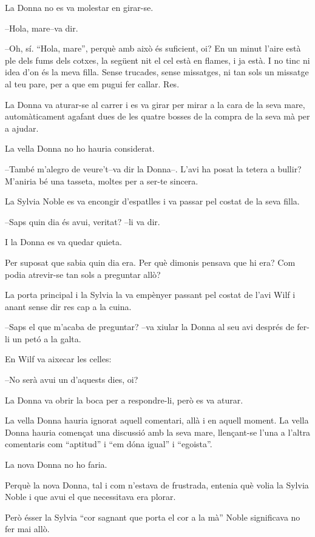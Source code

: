 La Donna no es va molestar en girar-se.

--Hola, mare--va dir.

--Oh, sí. ``Hola, mare'', perquè amb això és suficient, oi? En un minut
l'aire està ple dels fums dels cotxes, la següent nit el cel està en
flames, i ja està. I no tinc ni idea d'on és la meva filla. Sense
trucades, sense missatges, ni tan sols un missatge al teu pare, per a
que em pugui fer callar. Res.

La Donna va aturar-se al carrer i es va girar per mirar a la cara de la
seva mare, automàticament agafant dues de les quatre bosses de la compra
de la seva mà per a ajudar.

La vella Donna no ho hauria considerat.

--També m'alegro de veure't--va dir la Donna--. L'avi ha posat la tetera
a bullir? M'aniria bé una tasseta, moltes per a ser-te sincera.

La Sylvia Noble es va encongir d'espatlles i va passar pel costat de la
seva filla.

--Saps quin dia és avui, veritat? --li va dir.

I la Donna es va quedar quieta.

Per suposat que sabia quin dia era. Per què dimonis pensava que hi era?
Com podia atrevir-se tan sols a preguntar allò?

La porta principal i la Sylvia la va empènyer passant pel costat de
l'avi Wilf i anant sense dir res cap a la cuina.

--Saps el que m'acaba de preguntar? --va xiular la Donna al seu avi
després de fer-li un petó a la galta.

En Wilf va aixecar les celles:

--No serà avui un d'aquests dies, oi?

La Donna va obrir la boca per a respondre-li, però es va aturar.

La vella Donna hauria ignorat aquell comentari, allà i en aquell moment.
La vella Donna hauria començat una discussió amb la seva mare,
llençant-se l'una a l'altra comentaris com ``aptitud'' i ``em dóna
igual'' i ``egoista''.

La nova Donna no ho faria.

Perquè la nova Donna, tal i com n'estava de frustrada, entenia què volia
la Sylvia Noble i que avui el que necessitava era plorar.

Però ésser la Sylvia ``cor sagnant que porta el cor a la mà'' Noble
significava no fer mai allò.

